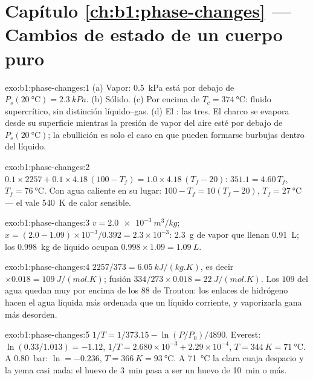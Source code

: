 \section*{Capítulo \ref{ch:b1:phase-changes} --- Cambios de estado de un cuerpo puro}

\begin{solution}{exo:b1:phase-changes:1}
(a) Vapor: \qty{0.5}{kPa} está por debajo de $P_s(\qty{20}{\degreeCelsius}) = \qty{2.3}{kPa}$.
(b) Sólido. (c) Por encima de $T_c = \qty{374}{\degreeCelsius}$: fluido
supercrítico, sin distinción líquido--gas. (d) El : las tres.
El charco se evapora desde su superficie mientras la presión de vapor del
aire esté por debajo de $P_s(\qty{20}{\degreeCelsius})$; la ebullición es
solo el caso en que pueden formarse burbujas dentro del líquido.
\end{solution}

\begin{solution}{exo:b1:phase-changes:2}
$0.1 \times 2257 + 0.1 \times 4.18\,(100 - T_f) = 1.0 \times 4.18\,(T_f - 20)$:
$351.1 = 4.60\,T_f$, $T_f = \qty{76}{\degreeCelsius}$. Con agua caliente en
su lugar: $100 - T_f = 10(T_f - 20)$, $T_f = \qty{27}{\degreeCelsius}$ --- el
 vale \qty{540}{K} de calor sensible.
\end{solution}

\begin{solution}{exo:b1:phase-changes:3}
$v = \qty{2.0e-3}{m^3/kg}$; $x = (2.0 - 1.09) \times 10^{-3}/0.392 = 2.3 \times 10^{-3}$:
\qty{2.3}{g} de vapor que llenan \qty{0.91}{L}; los \qty{0.998}{kg} de líquido
ocupan $0.998 \times 1.09 = \qty{1.09}{L}$.
\end{solution}

\begin{solution}{exo:b1:phase-changes:4}
$2257/373 = \qty{6.05}{kJ/(kg.K)}$, es decir $\times 0.018 = \qty{109}{J/(mol.K)}$;
fusión $334/273 \times 0.018 = \qty{22}{J/(mol.K)}$. Los $109$ del agua quedan
muy por encima de los $88$ de Trouton: los enlaces de hidrógeno hacen el
agua líquida más ordenada que un líquido corriente, y vaporizarla gana más desorden.
\end{solution}

\begin{solution}{exo:b1:phase-changes:5}
$1/T = 1/373.15 - \ln(P/P_0)/4890$. Everest: $\ln(0.33/1.013) = -1.12$,
$1/T = 2.680 \times 10^{-3} + 2.29 \times 10^{-4}$, $T = \qty{344}{K} =
\qty{71}{\degreeCelsius}$. A \qty{0.80}{bar}: $\ln = -0.236$, $T = \qty{366}{K} =
\qty{93}{\degreeCelsius}$. A \qty{71}{\degreeCelsius} la clara cuaja despacio
y la yema casi nada: el huevo de \qty{3}{min} pasa a ser un huevo de
\qty{10}{min} o más.
\end{solution}

